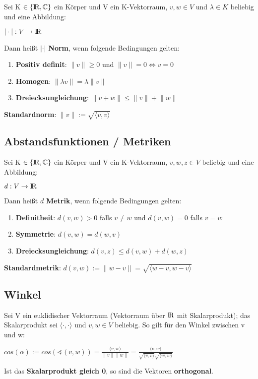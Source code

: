 \documentclass[10pt,a4paper]{article}
\def\realnumbers{{\rm I\!R}}
\def\complexnumbers{{\mathbb{C}}}
\newcommand{\norm}[1]{\lVert#1\rVert}
\begin{document}
	Sei K $\in \{\realnumbers,\complexnumbers\}$ ein Körper und V ein K-Vektorraum, $v, w \in V$ und $\lambda \in K$ beliebig und eine Abbildung:
	\begin{center}
		$|\cdot|: V \rightarrow \realnumbers$
	\end{center}
	Dann heißt $|\cdot|$ \textbf{Norm}, wenn folgende Bedingungen gelten:
	\begin{enumerate}
		\item \textbf{Positiv definit}: $\norm{v} \geq 0$ und $\norm{v} = 0 \Leftrightarrow v = 0$
		\item \textbf{Homogen}: $\norm{\lambda v} = \lambda \norm{v}$
		\item \textbf{Dreiecksungleichung}: $\norm{v + w} \leq \norm{v} + \norm{w}$
	\end{enumerate}
	\textbf{Standardnorm}: $\norm{v} := \sqrt{\langle v, v\rangle}$
	
	\subsection{Abstandsfunktionen / Metriken}
	\label{sp:sub:abstandsfunktionen_metriken}

	Sei K $\in \{\realnumbers,\complexnumbers\}$ ein Körper und V ein K-Vektorraum, $v, w, z \in V$ beliebig und eine Abbildung:
	\begin{center}
		$d: V \rightarrow \realnumbers$
	\end{center}
	Dann heißt $d$ \textbf{Metrik}, wenn folgende Bedingungen gelten:
	\begin{enumerate}
		\item \textbf{Definitheit}: $d(v, w) > 0$ falls $v \neq w$ und $d(v, w) = 0$ falls $v = w$
		\item \textbf{Symmetrie}: $d(v, w) = d(w, v)$
		\item \textbf{Dreiecksungleichung}: $d(v, z) \leq d(v, w) + d(w, z)$
	\end{enumerate}
	\textbf{Standardmetrik}: $d(v, w) := \norm{w - v} = \sqrt{\langle w - v, w - v\rangle}$
		
	\subsection{Winkel}
	\label{sp:sub:winkel}
	
	Sei V ein euklidischer Vektorraum (Vektorraum über $\realnumbers$ mit Skalarprodukt); das Skalarprodukt sei $\langle \cdot, \cdot\rangle$ und $v, w\in V$ beliebig. So gilt für den Winkel zwischen v und w:
	\begin{center}
		$cos(\alpha) := cos(\sphericalangle(v, w)) = \frac{\langle v, w\rangle}{\norm{v}\norm{w}} = \frac{\langle v, w\rangle}{\sqrt{\langle v, v \rangle}\sqrt{\langle w, w\rangle}}$
	\end{center}
	Ist das \textbf{Skalarprodukt gleich 0}, so sind die Vektoren \textbf{orthogonal}.
\end{document}
